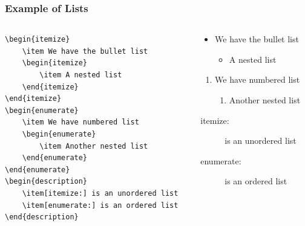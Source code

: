 \documentclass[aspectratio=169]{beamer}
\begin{document}
\begin{frame}[fragile]
\frametitle{Example of Lists}
    \begin{columns}
        \begin{column}{0.5\textwidth}
        \scriptsize
        \begin{verbatim}
\begin{itemize}
    \item We have the bullet list
    \begin{itemize}
        \item A nested list
    \end{itemize}
\end{itemize}
\begin{enumerate}
    \item We have numbered list
    \begin{enumerate}
        \item Another nested list
    \end{enumerate}
\end{enumerate}
\begin{description}
    \item[itemize:] is an unordered list
    \item[enumerate:] is an ordered list
\end{description}
        \end{verbatim}
        \normalsize
        \end{column}
            
        \begin{column}{0.5\textwidth}
\begin{itemize}
    \item We have the bullet list
    \begin{itemize}
        \item A nested list
    \end{itemize}
\end{itemize}
\begin{enumerate}
    \item We have numbered list
    \begin{enumerate}
        \item Another nested list
    \end{enumerate}
\end{enumerate}
\begin{description}
    \item[itemize:] is an unordered list
    \item[enumerate:] is an ordered list
\end{description}
        \end{column}
    \end{columns}
\end{frame}
\end{document}
